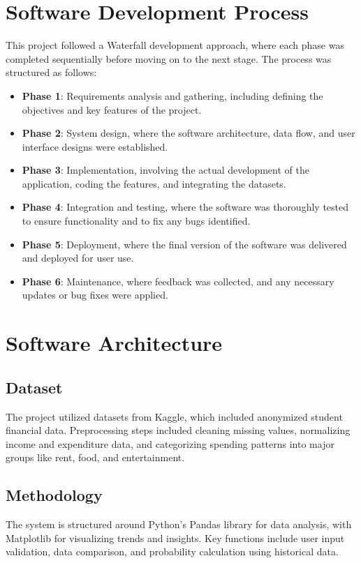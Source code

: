 \documentclass{article}
\begin{document}
\section{Software Development Process}
This project followed a Waterfall development approach, where each phase was completed sequentially before moving on to the next stage. The process was structured as follows:
\begin{itemize}
    \item \textbf{Phase 1}: Requirements analysis and gathering, including defining the objectives and key features of the project.
    \item \textbf{Phase 2}: System design, where the software architecture, data flow, and user interface designs were established.
    \item \textbf{Phase 3}: Implementation, involving the actual development of the application, coding the features, and integrating the datasets.
    \item \textbf{Phase 4}: Integration and testing, where the software was thoroughly tested to ensure functionality and to fix any bugs identified.
    \item \textbf{Phase 5}: Deployment, where the final version of the software was delivered and deployed for user use.
    \item \textbf{Phase 6}: Maintenance, where feedback was collected, and any necessary updates or bug fixes were applied.
\end{itemize}

\section{Software Architecture}

\subsection{Dataset}
The project utilized datasets from Kaggle, which included anonymized student financial data. Preprocessing steps included cleaning missing values, normalizing income and expenditure data, and categorizing spending patterns into major groups like rent, food, and entertainment.

\subsection{Methodology}
The system is structured around Python's Pandas library for data analysis, with Matplotlib for visualizing trends and insights. Key functions include user input validation, data comparison, and probability calculation using historical data.
\end{document}
